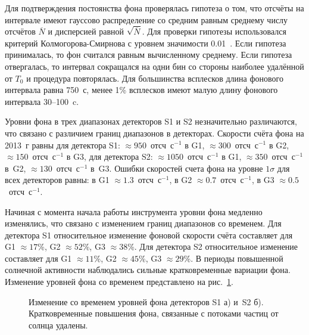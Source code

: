 Для подтверждения постоянства фона проверялась гипотеза о том, что отсчёты на 
интервале имеют гауссово распределение со средним равным среднему числу отсчётов 
$\overline{N}$ и дисперсией равной $\sqrt{\overline{N}}$. Для проверки гипотезы 
использовался критерий Колмогорова-Смирнова с уровнем значимости 0.01~\citep{Press_1992NumRec}. 
Если гипотеза принималась, то фон считался равным вычисленному среднему. 
Если гипотеза отвергалась, то интервал сокращался на одни бин со стороны наиболее 
удалённой от $T_0$ и процедура повторялась. Для большинства всплесков длина 
фонового интервала равна 750~с, менее 1\% всплесков имеют малую длину фонового интервала 30--100~c.

Уровни фона в трех диапазонах детекторов S1 и S2 незначительно различаются, 
что связано с различием границ диапазонов в детекторах. Скорости счёта фона 
на 2013~г равны для детектора S1: $\approx 950$~отсч~с$^{-1}$ в G1, 
$\approx 300$~отсч~с$^{-1}$ в G2, $\approx 150$~отсч~с$^{-1}$ в G3, 
для детектора S2: $\approx 1050$~отсч~с$^{-1}$ в G1, $\approx 350$~отсч~с$^{-1}$ в~G2, 
$\approx 130$~отсч~с$^{-1}$ в~G3. Ошибки скоростей счета фона на уровне $1 \sigma$ 
для всех детекторов равны: в G1 $\approx 1.3$~отсч~с$^{-1}$, в G2 $\approx 0.7$~отсч~с$^{-1}$, 
в G3 $\approx 0.5$~отсч~с$^{-1}$. 

Начиная с момента начала работы инструмента уровни фона медленно изменялись, 
что связано с изменением границ диапазонов со временем. Для детектора S1 относительное 
изменение фоновой скорости счёта составляет для G1 $\approx 17$\%, G2 $\approx 52$\%, G3 $\approx 38$\%. 
Для детектора S2 относительное изменение составляет для G1 $\approx 11$\%, G2 $\approx 45$\%, G3 $\approx 29$\%. 
В периоды повышенной солнечной активности наблюдались сильные кратковременные вариации фона. 
Изменение уровней фона со временем представлено на рис.~\ref{img:KW_bg_drift}.

\begin{figure}[h]
  \begin{minipage}[h]{0.5\textwidth}
  \end{minipage}
  \hfill
  \begin{minipage}[h]{0.5\textwidth}
  \end{minipage}
  \caption[Изменение со временем уровней фона детекторов S1 и~S2]
  {Изменение со временем уровней фона детекторов S1 а) и~S2 б). 
  Кратковременные повышения фона, связанные с потоками частиц от солнца удалены.}
  \label{img:KW_bg_drift}  
\end{figure}

